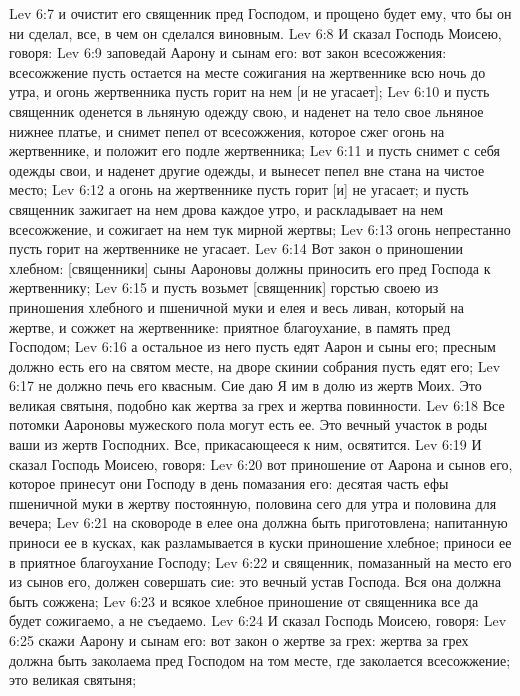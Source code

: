 \vs Lev 6:7 и очистит его священник пред Господом, и прощено будет ему, что бы он ни сделал, все, в чем он сделался виновным.
\rsbpar\vs Lev 6:8 И сказал Господь Моисею, говоря:
\vs Lev 6:9 заповедай Аарону и сынам его: вот закон всесожжения: всесожжение пусть остается на месте сожигания на жертвеннике всю ночь до утра, и огонь жертвенника пусть горит на нем [и не угасает];
\vs Lev 6:10 и пусть священник оденется в льняную одежду свою, и наденет на тело свое льняное нижнее платье, и снимет пепел от всесожжения, которое сжег огонь на жертвеннике, и положит его подле жертвенника;
\vs Lev 6:11 и пусть снимет с себя одежды свои, и наденет другие одежды, и вынесет пепел вне стана на чистое место;
\vs Lev 6:12 а огонь на жертвеннике пусть горит [и] не угасает; и пусть священник зажигает на нем дрова каждое утро, и раскладывает на нем всесожжение, и сожигает на нем тук мирной жертвы;
\vs Lev 6:13 огонь непрестанно пусть горит на жертвеннике  не угасает.
\rsbpar\vs Lev 6:14 Вот закон о приношении хлебном: [священники] сыны Аароновы должны приносить его пред Господа к жертвеннику;
\vs Lev 6:15 и пусть возьмет [священник] горстью своею из приношения хлебного и пшеничной муки и елея и весь ливан, который на жертве, и сожжет на жертвеннике:  приятное благоухание, в память пред Господом;
\vs Lev 6:16 а остальное из него пусть едят Аарон и сыны его; пресным должно есть его на святом месте, на дворе скинии собрания пусть едят его;
\vs Lev 6:17 не должно печь его квасным. Сие даю Я им в долю из жертв Моих. Это великая святыня, подобно как жертва за грех и жертва повинности.
\vs Lev 6:18 Все потомки Аароновы мужеского пола могут есть ее. Это вечный участок в роды ваши из жертв Господних. Все, прикасающееся к ним, освятится.
\rsbpar\vs Lev 6:19 И сказал Господь Моисею, говоря:
\vs Lev 6:20 вот приношение от Аарона и сынов его, которое принесут они Господу в день помазания его: десятая часть ефы пшеничной муки в жертву постоянную, половина сего для утра и половина для вечера;
\vs Lev 6:21 на сковороде в елее она должна быть приготовлена; напитанную  приноси ее в кусках, как разламывается в куски приношение хлебное; приноси ее в приятное благоухание Господу;
\vs Lev 6:22 и священник, помазанный на место его из сынов его, должен совершать сие: это вечный устав Господа. Вся она должна быть сожжена;
\vs Lev 6:23 и всякое хлебное приношение от священника все да будет сожигаемо, а не съедаемо.
\rsbpar\vs Lev 6:24 И сказал Господь Моисею, говоря:
\vs Lev 6:25 скажи Аарону и сынам его: вот закон о жертве за грех: жертва за грех должна быть заколаема пред Господом на том месте, где заколается всесожжение; это великая святыня;
